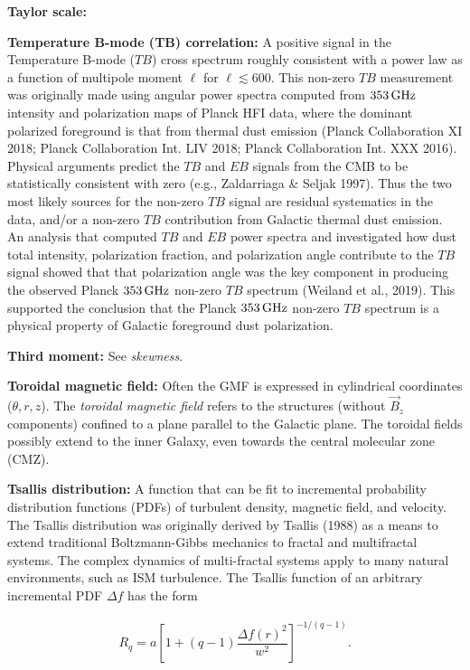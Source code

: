 \documentclass[a4paper,10pt]{article}
\begin{document}
{\noindent}\textbf{Taylor scale:}

{\noindent}\textbf{Temperature B-mode (TB) correlation:} A positive signal in the Temperature B-mode ($TB$) cross spectrum roughly consistent with a power law as a function of multipole moment $\ell$ for $\ell\lesssim600$. This non-zero $TB$ measurement was originally made using angular power spectra computed from $353\,{\rm GHz}$ intensity and polarization maps of Planck HFI data, where the dominant polarized foreground is that from thermal dust emission (Planck Collaboration XI 2018; Planck Collaboration Int. LIV 2018; Planck Collaboration Int. XXX 2016). Physical arguments predict the $TB$ and $EB$ signals from the CMB to be statistically consistent with zero (e.g., Zaldarriaga \& Seljak 1997). Thus the two most likely sources for the non-zero $TB$ signal are residual systematics in the data, and/or a non-zero $TB$ contribution from Galactic thermal dust emission. An analysis that computed $TB$ and $EB$ power spectra and investigated how dust total intensity, polarization fraction, and polarization angle contribute to the $TB$ signal showed that that polarization angle was the key component in producing the observed Planck $353\,{\rm GHz}$ non-zero $TB$ spectrum (Weiland et al., 2019). This supported the conclusion that the Planck $353\,{\rm GHz}$ non-zero $TB$ spectrum is a physical property of Galactic foreground dust polarization.

{\noindent}\textbf{Third moment:} See \textit{skewness}.

{\noindent}\textbf{Toroidal magnetic field:} Often the GMF is expressed in cylindrical coordinates ($\theta, r, z$). The \textit{toroidal magnetic field} refers to the structures (without $\vec{B}_z$ components) confined to a plane parallel to the Galactic plane. The toroidal fields possibly extend to the inner Galaxy, even towards the central molecular zone (CMZ).

{\noindent}\textbf{Tsallis distribution:} A function that can be fit to incremental probability distribution functions (PDFs) of turbulent density, magnetic field, and velocity. The Tsallis distribution was originally derived by Tsallis (1988) as a means to extend traditional Boltzmann-Gibbs mechanics to fractal and multifractal systems. The complex dynamics of multi-fractal systems apply to many natural environments, such as ISM turbulence. The Tsallis function of an arbitrary incremental PDF $\Delta f$ has the form

\begin{align*}
    R_q = a \left[ 1+(q-1) \dfrac{\Delta f(r)^2}{w^2} \right]^{-1/(q-1)}.
\end{align*}
\end{document}

